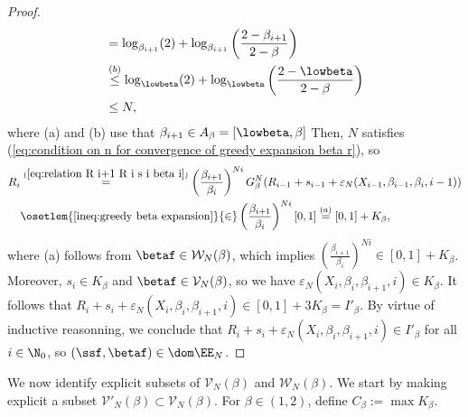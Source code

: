 \begin{proof}
\begin{align}
		& = \log_{\beta_{i+1}}(2) + \log_{\beta_{i+1}}\left( \frac{2- {\beta_{i+1}}}{2 - \beta} \right)\\
		&\overset{(b)}{\leq} \log_{\lowbeta}(2) + \log_{\lowbeta}\left( \frac{2- {\lowbeta}}{2 - \beta} \right)\\
		& \leq N,
	\end{align}
	where (a) and (b) use that $\beta_{i+1} \in A_\beta = [\lowbeta, \beta]$
	Then, $N$ satisfies (\ref{eq:condition on n for convergence of greedy expansion beta r}), so
	\allowdisplaybreaks
	\begin{align}\label{eq:R i is in 0 1 beta r}
		R_{i} &\overset{(\ref{eq:relation R i+1 R i s i beta i})}{=} \left(\frac{\beta_{i+1}}{\beta_{i}}\right)^{Ni} G^N_\beta(R_{i-1} + s_{i-1} + \varepsilon_N(X_{i-1}, \beta_{i-1}, \beta_{i} , i-1))\\
		& \osetlem{\ref{ineq:greedy beta expansion}}{\in} \left(\frac{\beta_{i+1}}{\beta_{i}}\right)^{Ni}[0,1] \overset{(a)}{=} [0,1] + K_\beta,
	\end{align}
	where (a) follows from $\betaf \in \mathcal W_N(\beta)$, which implies $\left(\frac{\beta_{i+1}}{\beta_{i}}\right)^{Ni} \in [0,1] + K_\beta$. Moreover, $s_i \in K_\beta$ and $\betaf \in \mathcal V_N(\beta)$, so we have $\varepsilon_N(X_i, \beta_i, \beta_{i+1} , i) \in K_\beta$. It follows that $R_i + s_i + \varepsilon_N(X_i, \beta_i, \beta_{i+1} , i) \in [0,1] + 3 K_\beta = I'_\beta$. By virtue of inductive reasonning, we conclude that $R_i + s_i + \varepsilon_N(X_i, \beta_i, \beta_{i+1} , i) \in I'_\beta$ for all $i \in \N_0$, so $(\ssf,\betaf) \in \dom \EE_N$.
\end{proof}
We now identify explicit subsets of $\mathcal V_N(\beta)$ and $\mathcal W_N(\beta)$. We start by making explicit a subset $\mathcal V'_N(\beta) \subset \mathcal V_N(\beta)$. For $\beta \in (1,2)$, define $C_\beta := \max K_\beta$.

